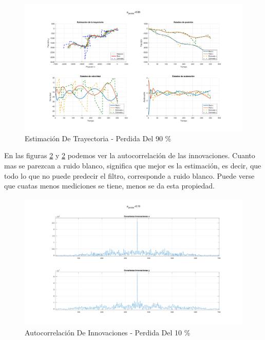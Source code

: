 	\begin{figure}[H]
		\centering
		\includegraphics[width=1.0\textwidth,keepaspectratio]{Figuras/graf_ej7_2.pdf}
		\caption{Estimación De Trayectoria - Perdida Del 90 \%}
		\label{fig:ej7_2}
	\end{figure}
	
	En las figuras \ref{fig:ej7_1_inov} y \ref{fig:ej7_1_inov} podemos ver la autocorrelación de las innovaciones. Cuanto mas se parezcan a ruido blanco, significa que mejor es la estimación, es decir, que todo lo que no puede predecir el filtro, corresponde a ruido blanco. Puede verse que cuatas menos mediciones se tiene, menos se da esta propiedad.
	
	\begin{figure}[H]
		\centering
		\includegraphics[width=1.0\textwidth,keepaspectratio]{Figuras/covinn_ej7_1.pdf}
		\caption{Autocorrelación De Innovaciones - Perdida Del 10 \%}
		\label{fig:ej7_1_inov}
	\end{figure}
	
